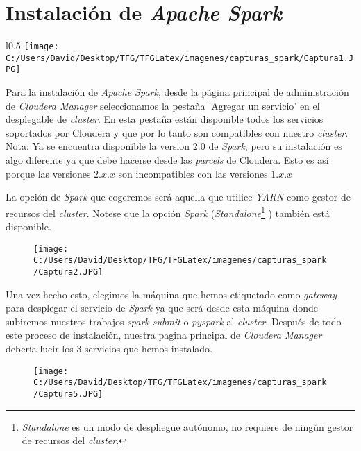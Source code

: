 \clearpage

\section{Instalación de \textit{Apache Spark}}\label{sec:instalacion_spark}
             
\begin{wrapfigure}[]{l}{0.5\textwidth}
  \centering
  \texttt{[image: C:/Users/David/Desktop/TFG/TFGLatex/imagenes/capturas\_spark/Captura1.JPG]}
\end{wrapfigure}

Para la instalación de \textit{Apache Spark}, desde la página principal de administración de \textit{Cloudera Manager}
seleccionamos la pestaña 'Agregar un servicio' en el desplegable de \textit{cluster}.
En esta pestaña están disponible todos los servicios soportados por Cloudera y que por lo tanto son compatibles
con nuestro \textit{cluster}.\\
Nota: Ya se encuentra disponible la version $2.0$ de \textit{Spark}, pero su
instalación es algo diferente ya que debe hacerse desde las \textit{parcels} de Cloudera. Esto es así porque
las versiones $2.x.x$ son incompatibles con las versiones $1.x.x$
\newline

La opción de \textit{Spark} que cogeremos será aquella que utilice \textit{YARN} como gestor de recursos del
\textit{cluster}.
Notese que la opción \textit{Spark} (\textit{Standalone}\footnote{\textit{Standalone} es un modo de despliegue
autónomo, no requiere de ningún gestor de recursos del \textit{cluster}.}
) también está disponible.

\begin{figure}[!htpb]
  \centering
  \texttt{[image: C:/Users/David/Desktop/TFG/TFGLatex/imagenes/capturas\_spark/Captura2.JPG]}
\end{figure}

Una vez hecho esto, elegimos la máquina que hemos etiquetado como \textit{gateway} para desplegar el servicio
de \textit{Spark} ya que será desde esta máquina donde subiremos nuestros trabajos 
\textit{spark-submit} o \textit{pyspark} al \textit{cluster}.
Después de todo este proceso de instalación, nuestra pagina principal de \textit{Cloudera Manager} debería lucir los 
3 servicios que hemos instalado.

\begin{figure}[!htpb]
  \centering
  \texttt{[image: C:/Users/David/Desktop/TFG/TFGLatex/imagenes/capturas\_spark/Captura5.JPG]}
\end{figure}

